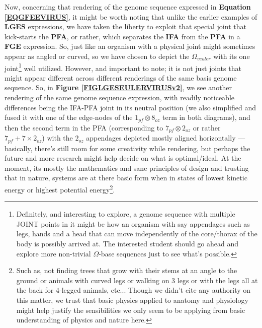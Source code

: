 \documentclass[a4paper, 18pt]{book} %
\begin{document}
Now, concerning that rendering of the genome sequence expressed in \textbf{Equation \ref{EQGFEEVIRUS}}, it might be worth noting that unlike the earlier examples of \textbf{LGES} expressions, we have taken the liberty to exploit that special joint that kick-starts the \textbf{PFA}, or rather, which separates the \textbf{IFA} from the \textbf{PFA} in a \textbf{FGE} expression. So, just like an organism with a physical joint might sometimes appear as angled or curved, so we have chosen to depict the $\Omega_{veuler}$ with its one joint\footnote{Definitely, and interesting to explore, a genome sequence with multiple JOINT points in it might be how an organism with say appendages such as legs, hands and a head that can move independently of the core/thorax of the body is possibly arrived at. The interested student should go ahead and explore more non-trivial $\Omega$-base sequences just to see what's possible.} well utilized. However, and important to note; it is not just joints that might appear different across different renderings of the same basis genome sequence. So, in \textbf{Figure \ref{FIGLGESEULERVIRUSv2}}, we see another rendering of the same genome sequence expression, with readily noticeable differences being the IFA-PFA joint in its neutral position (we also simplified and fused it with one of the edge-nodes of the $1_{pf} \otimes 8_{oz}$ term in both diagrams), and then the second term in the PFA (corresponding to \textbf{$7_{pf} \otimes 2_{oz}$} or rather \textbf{$7_{pf} + 7 \times 2_{oz}$}) with the $2_{oz}$ appendages depicted mostly aligned horizontally --- basically, there's still room for some creativity while rendering, but perhaps the future and more research might help decide on what is optimal/ideal. At the moment, its mostly the mathematics and sane principles of design and trusting that in nature, systems are at there basic form when in states of lowest kinetic energy or highest potential energy\footnote{Such as, not finding trees that grow with their stems at an angle to the ground or animals with curved legs or walking on 3 legs or with the legs all at the back for 4-legged animals, etc... Though we didn't cite any authority on this matter, we trust that basic physics applied to anatomy and physiology might help justify the sensibilities we only seem to be applying from basic understanding of physics and nature here.}.
\end{document}

